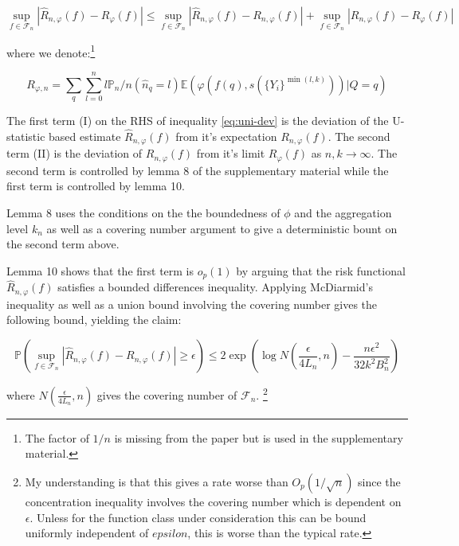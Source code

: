 \documentclass[a4paper,10pt]{article}
\begin{document}
\begin{equation}\label{eq:uni-dev}
  \sup_{f \in \mathcal{F}_n} \left| \hat{R}_{n, \varphi}(f) - R_\varphi(f) \right| \leq
  \sup_{f \in \mathcal{F}_n} \left| \hat{R}_{n, \varphi}(f) - R_{n, \varphi}(f) \right| +
  \sup_{f \in \mathcal{F}_n} \left| R_{n, \varphi}(f) - R_{\varphi}(f) \right|
\end{equation}

where we denote:\footnote{The factor of \(1/n\) is missing from the paper but is used in the supplementary material.}

\begin{equation}
  R_{\varphi, n} = \sum_q\sum_{l=0}^n l \mathbb{P}_n/n(\hat{n}_q = l) \mathbb{E}(\varphi(f(q), s(\{Y_i\}^{\min(l, k)}))|Q=q)
\end{equation}

The first term (I) on the RHS of inequality \ref{eq:uni-dev} is the deviation of the U-statistic based estimate \(\hat{R}_{n, \varphi}(f)\) from it's expectation \(R_{n, \varphi}(f)\). The second term (II) is the deviation of \(R_{n, \varphi}(f)\) from it's limit \(R_{\varphi}(f)\) as \(n, k \rightarrow \infty\). The second term is controlled by lemma 8 of the supplementary material \cite{duchi-2013-ranking} while the first term is controlled by lemma 10.

Lemma 8 uses the conditions on the the boundedness of \(\phi\) and the aggregation level \(k_n\) as well as a covering number argument to give a deterministic bount on the second term above.

Lemma 10 shows that the first term is \(o_p(1)\) by arguing that the risk functional \(\hat{R}_{n, \varphi}(f)\) satisfies a bounded differences inequality. Applying McDiarmid's inequality as well as a union bound involving the covering number gives the following bound, yielding the claim:

\begin{equation}
  \mathbb{P}\left( \sup_{f \in \mathcal{F}_n} \left| \hat{R}_{n, \varphi}(f) - R_{n, \varphi}(f) \right| \geq \epsilon \right) \leq 2\exp\left( \log N \left( \frac{\epsilon}{4L_n}, n \right) - \frac{n \epsilon^2}{32k^2B_n^2} \right)
\end{equation}

where \(N \left( \frac{\epsilon}{4L_n}, n \right)\) gives the covering number of \(\mathcal{F}_n\).
\footnote{My understanding is that this gives a rate worse than \(O_p(1/\sqrt n)\) since the concentration inequality involves the covering number which is dependent on \(\epsilon\). Unless for the function class under consideration this can be bound uniformly independent of \(epsilon\), this is worse than the typical rate.}
\end{document}
